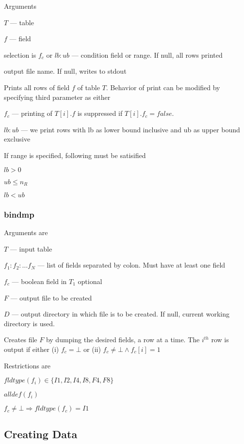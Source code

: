 \documentclass{report}
\begin{document}
\label{pr_fld}
Arguments 
\be
\item \(T\) --- table
\item \(f\) --- field
\item selection is \(f_c\) or \(lb:ub\) --- condition field or range. 
If null, all rows printed
\item output file name. If null, writes to stdout
\ee

Prints all rows of field \(f\) of table \(T\). Behavior of print can be
modified by specifying third parameter as either
\be
\item \(f_c\) --- printing of \(T[i].f\) is suppressed if \(T[i].f_c = false\).
\item \(lb:ub\) --- we print rows with lb as lower bound inclusive and
ub as upper bound exclusive
\ee

If range is specified, following must be satisified
\be
\item \(lb > 0 \)
\item \(ub \leq n_R\)
\item \(lb < ub\)
\ee

\subsubsection{bindmp}
\label{bindmp}
Arguments are
\be
\item \(T\) --- input table
\item \(f_1:f_2:\ldots f_N\) --- list of fields separated by colon. Must
have at least one field
\item \(f_c\) --- boolean field in \(T_1\) optional
\item \(F\) --- output file to be created
\item \(D\) --- output directory in which file is to be created. If
null, current working directory is used. 
\ee

Creates file \(F\) by dumping the desired fields, a row at a time. The
\(i^{th}\) row is output if either (i) \(f_c = \bot\) or (ii) 
  \(f_c \neq \bot \wedge f_c[i] = 1\) 

Restrictions are
\be
\item \(fldtype(f_i) \in \{ I1, I2, I4, I8, F4, F8\}\)
\item \(alldef(f_i)\)
\item \(f_c \neq \bot \Rightarrow fldtype(f_c) = I1\)
\ee

\subsection{Creating Data}
\end{document}
